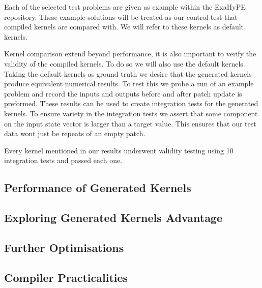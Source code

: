 Each of the selected test problems are given as example within the ExaHyPE repository.
These example solutions will be treated as our control test that compiled kernels are compared with.
We will refer to these kernels as default kernels. 

Kernel comparison extend beyond performance, it is also important to verify the validity of the compiled kernels.
To do so we will also use the default kernels.
Taking the default kernels as ground truth we desire that the generated kernels produce equivalent numerical results.
To test this we probe a run of an example problem and record the inputs and outputs before and after patch update is preformed.
These results can be used to create integration tests for the generated kernels.
To ensure variety in the integration tests we assert that some component on the input state vector is larger than a target value. 
This ensures that our test data wont just be repeats of an empty patch.

Every kernel mentioned in our results underwent validity testing using 10 integration tests and passed each one.

\subsection{Performance of Generated Kernels}

\subsection{Exploring Generated Kernels Advantage}

\subsection{Further Optimisations}

\subsection{Compiler Practicalities} \label{sec:practical}
